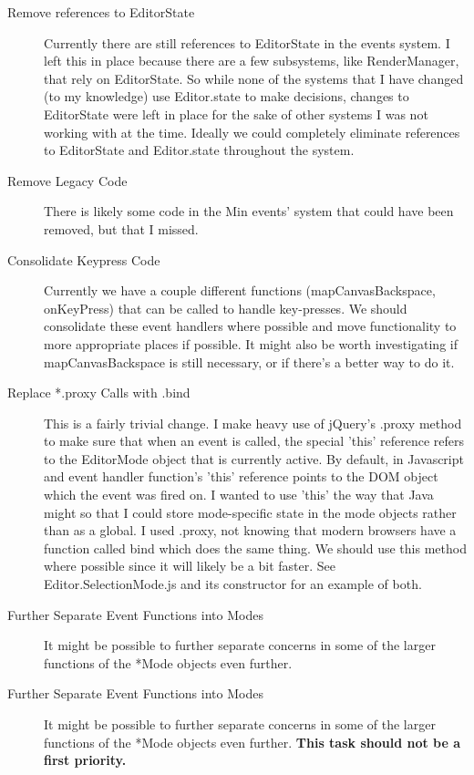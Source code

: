\documentclass[letterpaper]{article}
\begin{document}
\begin{description}
    \item[Remove references to EditorState] Currently there are still references
        to EditorState in the events system. I left this in place because there
        are a few subsystems, like RenderManager, that rely on EditorState. So
        while none of the systems that I have changed (to my knowledge) use
        Editor.state to make decisions, changes to EditorState were left in
        place for the sake of other systems I was not working with at the time.
        Ideally we could completely eliminate references to EditorState and
        Editor.state throughout the system.
    \item[Remove Legacy Code] There is likely some code in the Min events' system
        that could have been removed, but that I missed. 
    \item[Consolidate Keypress Code] Currently we have a couple different
        functions (mapCanvasBackspace, onKeyPress) that can be called to handle key-presses. We should
        consolidate these event handlers where possible and move functionality
        to more appropriate places if possible. It might also be worth
        investigating if mapCanvasBackspace is still necessary, or if there's a
        better way to do it.
    \item[Replace *.proxy Calls with .bind] This is a fairly trivial change. I
        make heavy use of jQuery's .proxy method to make sure that when an event
        is called, the special 'this' reference refers to the EditorMode object
        that is currently active. By default, in Javascript and event handler
        function's 'this' reference points to the DOM object which the event was
        fired on. I wanted to use 'this' the way that Java might so that I could
        store mode-specific state in the mode objects rather than as a global. I
        used .proxy, not knowing that modern browsers have a function called
        bind which does the same thing. We should use this method where possible
        since it will likely be a bit faster. See Editor.SelectionMode.js and
        its constructor for an example of both.
    \item[Further Separate Event Functions into Modes] It might be
        possible to further separate concerns in some of the larger functions of
        the *Mode objects even further. 
    \item[Further Separate Event Functions into Modes] It might be
        possible to further separate concerns in some of the larger functions of
        the *Mode objects even further. \textbf{This task should not be a first
        priority.}
\end{description}
\end{document}
